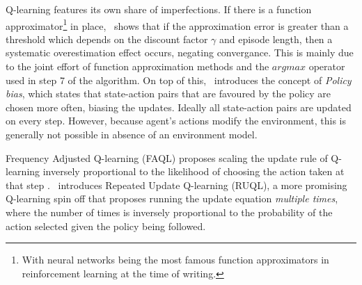 \documentclass{../main.tex}{}
\begin{document}
Q-learning features its own share of imperfections. If there is a function approximator\footnote{With neural networks being the most famous function approximators in reinforcement learning at the time of writing.} in place,~\cite{Thrun1993} shows that if the approximation error is greater than a threshold which depends on the discount factor $\gamma$ and episode length, then a systematic overestimation effect occurs, negating convergance. This is mainly due to the joint effort of function approximation methods and the $argmax$ operator used in step 7 of the algorithm. On top of this,~\cite{Kaisers2010} introduces the concept of \textit{Policy bias}, which states that state-action pairs that are favoured by the policy are chosen more often, biasing the updates. Ideally all state-action pairs are updated on every step. However, because agent's actions modify the environment, this is generally not possible in absence of an environment model.

Frequency Adjusted Q-learning (FAQL) proposes scaling the update rule of Q-learning inversely proportional to the likelihood of choosing the action taken at that step \citep{Kaisers2010}.~\cite{Abdallah2016} introduces Repeated Update Q-learning (RUQL), a more promising Q-learning spin off that proposes running the update equation \textit{multiple times}, where the number of times is inversely proportional to the probability of the action selected given the policy being followed.

\end{document}
